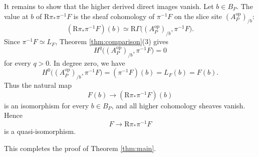 \documentclass{article}
\theoremstyle{definition}
\begin{document}
It remains to show that the higher derived direct images vanish.  Let \(b\in B_P\).  The value at \(b\) of \(\mathrm R\pi_*\pi^{-1}F\) is the sheaf cohomology of \(\pi^{-1}F\) on the slice site \((A_P^{\mathrm{op}})_{/b}\):
\[
(\mathrm R\pi_*\pi^{-1}F)(b)
\simeq
\mathrm R\Gamma\bigl((A_P^{\mathrm{op}})_{/b},\pi^{-1}F\bigr).
\]
Since \(\pi^{-1}F\simeq L_F\), Theorem \ref{thm:comparison}(3) gives
\[
H^q\bigl((A_P^{\mathrm{op}})_{/b},\pi^{-1}F\bigr)=0
\]
for every \(q>0\).  In degree zero, we have
\[
H^0\bigl((A_P^{\mathrm{op}})_{/b},\pi^{-1}F\bigr)
=
(\pi^{-1}F)(b)
=
L_F(b)
=
F(b).
\]
Thus the natural map
\[
F(b)\longrightarrow (\mathrm R\pi_*\pi^{-1}F)(b)
\]
is an isomorphism for every \(b\in B_P\), and all higher cohomology sheaves vanish.  Hence
\[
F\longrightarrow \mathrm R\pi_*\pi^{-1}F
\]
is a quasi-isomorphism.

This completes the proof of Theorem \ref{thm:main}.
\end{document}

